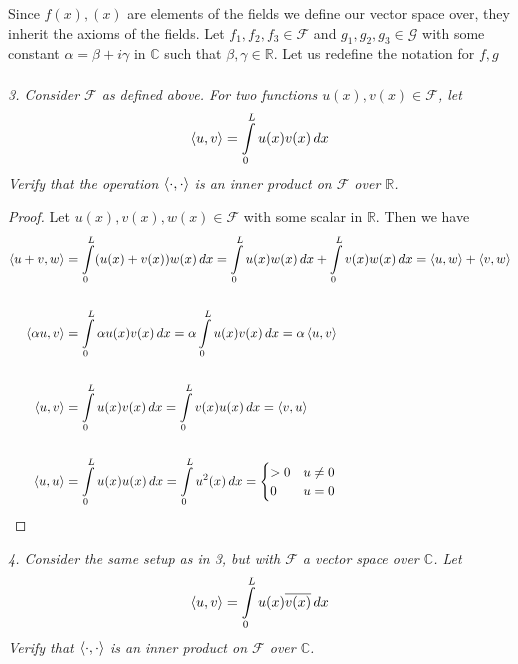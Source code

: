 \documentclass[12pt]{article}
\theoremstyle{remark}
\begin{document}
Since $f(x), (x)$ are elements of the fields we define our vector space over, they inherit the axioms of the fields. Let $f_1,f_2,f_3 \in \mathcal{F}$ and $g_1,g_2,g_3 \in \mathcal{G}$ with some constant $\alpha = \beta + i\gamma$ in $\mathbb{C}$ such that $\beta, \gamma \in \mathbb{R}$. Let us redefine the notation for $f,g$
\begin{align*}
	[]
\end{align*}

\newpage

\textit{3. Consider $\mathcal{F}$ as defined above. For two functions $u(x), v(x) \in \mathcal{F}$, let}
\begin{align*}
	\braket{u,v} = \int\limits_0^L u(x)v(x) \, dx
\end{align*}
\textit{Verify that the operation $\braket{\cdot, \cdot}$ is an inner product on $\mathcal{F}$ over $\mathbb{R}$.} \\
\begin{proof}
	Let $u(x), v(x), w(x) \in \mathcal{F}$ with some scalar in $\mathbb{R}$. Then we have 
	\begin{align*}
		\braket{u+v,w} & = \int\limits_0^L (u(x) + v(x))w(x) \, dx = \int\limits_0^L u(x)w(x) \, dx + \int\limits_0^L v(x)w(x) \, dx = \braket{u,w} + \braket{v,w} \\ \\
		\braket{\alpha u, v} & = \int\limits_0^L \alpha u(x)v(x) \, dx = \alpha\int\limits_0^L u(x)v(x) \, dx = \alpha\braket{u,v} \\ \\
		\braket{u,v} & = \int\limits_0^L u(x)v(x) \, dx = \int\limits_0^L v(x)u(x) \, dx = \braket{v,u} \\ \\
		\braket{u,u} & = \int\limits_0^L u(x)u(x) \, dx = \int\limits_0^L u^2(x) \, dx = 
		\begin{cases}
		>0 & u \neq 0 \\
		0 & u = 0
		\end{cases}
	\end{align*}
\end{proof}

\newpage

\textit{4. Consider the same setup as in 3, but with $\mathcal{F}$ a vector space over $\mathbb{C}$. Let}
\begin{align*}
	\braket{u,v} = \int\limits_0^L u(x)\overline{v(x)} \, dx
\end{align*}
\textit{Verify that $\braket{\cdot, \cdot}$ is an inner product on $\mathcal{F}$ over $\mathbb{C}$.} \\ 
\end{document}
